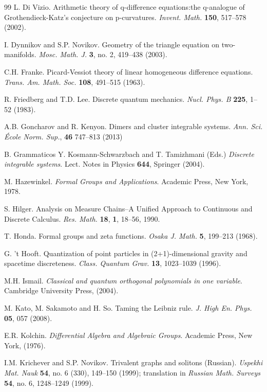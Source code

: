 \documentclass[10pt]{amsart}
\numberwithin{equation}{section}
\theoremstyle{definition}
\begin{document}
\begin{thebibliography}{99}
 L. Di Vizio. Arithmetic theory of q-difference equations:the q-analogue of Grothendieck-Katz's conjecture on p-curvatures. \textit{Invent. Math.} \textbf{150}, 517--578 (2002).

 I. Dynnikov and S.P. Novikov. Geometry of the triangle equation on two-manifolds. \textit{Mosc. Math. J.} \textbf{3}, no. 2, 419--438 (2003).

 C.H. Franke. Picard-Vessiot theory of linear homogeneous difference equations. \textit{Trans. Am. Math. Soc.} \textbf{108}, 491--515 (1963).

 R. Friedberg and T.D. Lee. Discrete quantum mechanics. \textit{Nucl. Phys. B} \textbf{225}, 1--52 (1983).

 A.B. Goncharov and  R. Kenyon. Dimers and cluster integrable systems. \textit{Ann. Sci. \'Ecole Norm. Sup.}, 
\textbf{46} 747--813 (2013)

 B. Grammaticos Y. Kosmann-Schwarzbach and T. Tamizhmani (Eds.) \textit{Discrete integrable systems}. Lect. Notes in Physics \textbf{644}, Springer (2004).

 M. Hazewinkel. \textit{Formal Groups and Applications}. Academic Press, New York, 1978.

 S. Hilger. Analysis on Measure Chains--A Unified Approach to Continuous and Discrete Calculus. \textit{Res.  Math.} \textbf{18}, \textbf{1}, 18--56, 1990.

 T. Honda.  Formal groups and zeta functions. \textit{Osaka J. Math.} \textbf{5}, 199--213 (1968).

 G. 't Hooft. Quantization of point particles in (2+1)-dimensional gravity and spacetime
discreteness. \textit{Class. Quantum Grav.} \textbf{13}, 1023--1039 (1996).

 M.H. Ismail. \textit{Classical and quantum orthogonal polynomials in one variable}. Cambridge University Press, (2004).

 M. Kato, M. Sakamoto and H. So. Taming the Leibniz rule. \textit{J. High En. Phys.}  \textbf{05}, 057 (2008).

 E.R. Kolchin. \textit{Differential Algebra and Algebraic Groups}. Academic Press, New York, (1976).

 I.M. Krichever and S.P. Novikov. Trivalent graphs and solitons (Russian).  \textit{Uspekhi Mat. Nauk}  \textbf{54},  no. 6 (330), 149--150 (1999);  translation in \textit{Russian Math. Surveys}  \textbf{54},  no. 6, 1248--1249 (1999).


\end{thebibliography}
\end{document}
